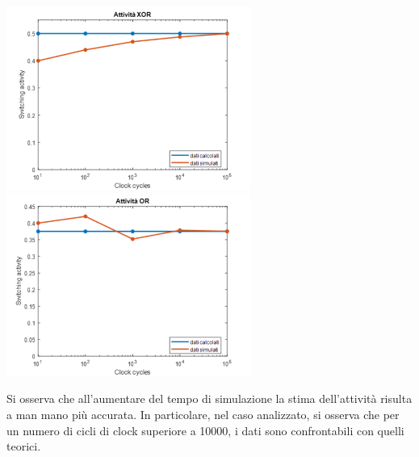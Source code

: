 \documentclass[11pt,  english, makeidx, a4paper, titlepage, oneside]{book}
\begin{document}
\centerline{\includegraphics[width=8cm]{./img/Lab_1/Es_1/XOR.png}
            \includegraphics[width=8cm]{./img/Lab_1/Es_1/OR.png}}
\vspace{0.5cm}
Si osserva che all'aumentare del tempo di simulazione la stima 
dell'attività risulta a man mano più accurata. In particolare, 
nel caso analizzato, si osserva che per un numero di cicli di clock 
superiore a 10000, i dati sono confrontabili con quelli teorici.
\newpage
\end{document}
